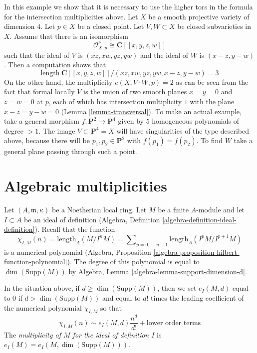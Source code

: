 \begin{example}
\label{example-naive-multiplicity-wrong}
In this example we show that it is necessary to use the higher
tors in the formula for the intersection multiplicities above.
Let $X$ be a smooth projective variety of dimension $4$.
Let $p \in X$ be a closed point. Let $V, W \subset X$
be closed subvarieties in $X$. Assume that there is an
isomorphism
$$
\mathcal{O}_{X, p}^\wedge \cong \mathbf{C}[[x, y, z, w]]
$$
such that the ideal of $V$ is $(xz, xw, yz, yw)$ and the ideal
of $W$ is $(x - z, y - w)$. Then a computation shows that
$$
\text{length}\ \mathbf{C}[[x, y, z, w]]/
(xz, xw, yz, yw, x - z, y - w) = 3
$$
On the other hand, the multiplicity $e(X, V \cdot W, p) = 2$
as can be seen from the fact that formal locally $V$ is the
union of two smooth planes $x = y = 0$ and $z = w = 0$ at $p$,
each of which has intersection multiplicity $1$ with the plane
$x - z = y - w = 0$ (Lemma \ref{lemma-transversal}). To make an
actual example, take
a general morphism $f : \mathbf{P}^2 \to \mathbf{P}^4$ given by
$5$ homogeneous polynomials of degree $> 1$. The image
$V \subset \mathbf{P}^4 = X$ will have singularities of the type
described above, because there will be $p_1, p_2 \in \mathbf{P}^2$
with $f(p_1) = f(p_2)$. To find $W$ take a general plane passing
through such a point.
\end{example}






\section{Algebraic multiplicities}
\label{section-multiplicities}

\noindent
Let $(A, \mathfrak m, \kappa)$ be a Noetherian local ring.
Let $M$ be a finite $A$-module and let $I \subset A$ be an ideal
of definition (Algebra, Definition \ref{algebra-definition-ideal-definition}).
Recall that the function
$$
\chi_{I, M}(n) = \text{length}_A(M/I^nM) =
\sum\nolimits_{p = 0, \ldots, n - 1} \text{length}_A(I^pM/I^{p + 1}M)
$$
is a numerical polynomial
(Algebra, Proposition \ref{algebra-proposition-hilbert-function-polynomial}).
The degree of this polynomial is equal to $\dim(\text{Supp}(M))$ by
Algebra, Lemma \ref{algebra-lemma-support-dimension-d}.

\begin{definition}
\label{definition-multiplicity}
In the situation above, if $d \geq \dim(\text{Supp}(M))$, then we set
$e_I(M, d)$ equal to $0$ if $d > \dim(\text{Supp}(M))$
and equal to $d!$ times the
leading coefficient of the numerical polynomial $\chi_{I, M}$ so that
$$
\chi_{I, M}(n) \sim e_I(M, d) \frac{n^d}{d!} + \text{lower order terms}
$$
The {\it multiplicity of $M$ for the ideal of definition $I$}
is $e_I(M) = e_I(M, \dim(\text{Supp}(M)))$.
\end{definition}

